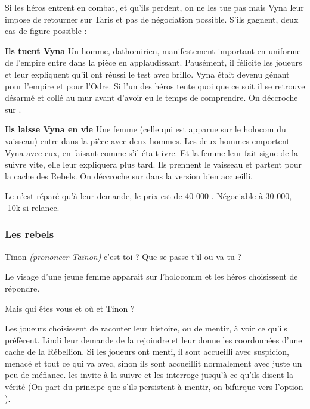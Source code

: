 Si les héros entrent en combat, et qu'ils perdent, on ne les tue pas mais Vyna leur impose de retourner sur Taris et pas de négociation possible. S'ils gagnent, deux cas de figure possible :
\begin{rebelist}
    \item \textbf{Ils tuent Vyna} Un homme, dathomirien, manifestement important en uniforme de l'empire entre dans la pièce en applaudissant. Pausément, il félicite les joueurs et   leur expliquent qu'il ont réussi le test avec brillo. Vyna était devenu génant pour l'empire et pour l'Odre. Si l'un des héros tente quoi que ce soit il se retrouve désarmé et collé au mur avant d'avoir eu le temps de comprendre. On déccroche sur .

    \item \textbf{Ils laisse Vyna en vie} Une femme (celle qui est apparue sur le holocom du vaisseau) entre dans la pièce avec deux hommes. Les deux hommes emportent Vyna avec eux, en faisant comme s'il était ivre. Et la femme leur fait signe de la suivre vite, elle leur expliquera plus tard. Ils prennent le vaisseau et partent pour la cache des Rebels. On déccroche sur  dans la version bien accueilli.
\end{rebelist}

Le  n'est réparé qu'à leur demande, le prix est de 40 000 \crg. Négociable à 30 000, -10k si relance.


\subsubsection{Les rebels} \label{sec:les-rebels}

\begin{quotebox}
    Tinon \emph{(prononcer Taïnon)} c’est toi ? Que se passe t’il ou va tu ?
\end{quotebox}

Le visage d’une jeune femme apparait sur l’holocomm et les héros choisissent de répondre.

\begin{quotebox}
    Mais qui êtes vous et où et Tinon ?
\end{quotebox}
Les joueurs choisissent de raconter leur histoire, ou de mentir, à voir ce qu'ils préfèrent. Lindi leur demande de la rejoindre et leur donne les coordonnées d'une cache de la Rébellion. Si les joueurs ont menti, il sont accueilli avec suspicion, menacé et tout ce qui va avec, sinon ils sont accueillit normalement avec juste un peu de méfiance.  les invite à la suivre et les interroge jusqu'à ce qu'ils disent la vérité (On part du principe que s'ils persistent à mentir, on bifurque vers l'option ).

